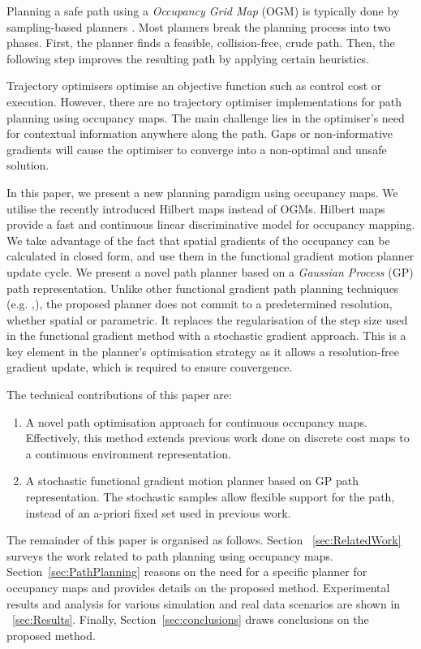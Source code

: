 \documentclass[letterpaper, 10 pt, conference]{ieeeconf}  %
\begin{document}
Planning a safe path using a \textit{Occupancy Grid Map} (OGM) is typically done by sampling-based planners \cite{Tsardoulias2016}. Most planners break the planning process into two phases. First, the planner finds a feasible, collision-free, crude path. Then, the following step improves the resulting path by applying certain heuristics. 

Trajectory optimisers optimise an objective function such as control cost or execution. However, there are no trajectory optimiser implementations for path planning using occupancy maps. The main challenge lies in the optimiser's need for contextual information anywhere along the path. Gaps or non-informative gradients will cause the optimiser to converge into a non-optimal and unsafe solution.    

In this paper, we present a new planning paradigm using occupancy maps. We utilise the recently introduced Hilbert maps \cite{ramos2015hilbert} instead of OGMs. Hilbert maps provide a fast and continuous linear discriminative model for occupancy mapping. We take advantage of the fact that spatial gradients of the occupancy can be calculated in closed form, and use them in the functional gradient motion planner update cycle. We present a novel path planner based on a \textit{Gaussian Process} (GP) path representation. Unlike other functional gradient path planning techniques (e.g. \cite{Marinho2016},\cite{Zucker2013}), the proposed planner does not commit to a predetermined resolution, whether spatial or parametric. It replaces the regularisation of the step size used in the functional gradient method with a stochastic gradient approach. This is a key element in the planner's optimisation strategy as it allows a resolution-free gradient update, which is required to ensure convergence.

The technical contributions of this paper are:
\begin{enumerate}
    \item A novel path optimisation approach for continuous occupancy maps. Effectively, this method extends previous work done on discrete cost maps to a continuous environment representation. 
	\item A stochastic functional gradient motion planner based on GP path representation. The stochastic samples allow flexible support for the path, instead of an a-priori fixed set used in previous work.
\end{enumerate}

The remainder of this paper is organised as follows. Section ~\ref{sec:RelatedWork} surveys the work related to path planning using occupancy maps. Section~\ref{sec:PathPlanning} reasons on the need for a specific planner for occupancy maps and provides details on the proposed method. Experimental results and analysis for various simulation and real data scenarios are shown in ~\ref{sec:Results}. Finally, Section~\ref{sec:conclusions} draws conclusions on the proposed method.
\end{document}
